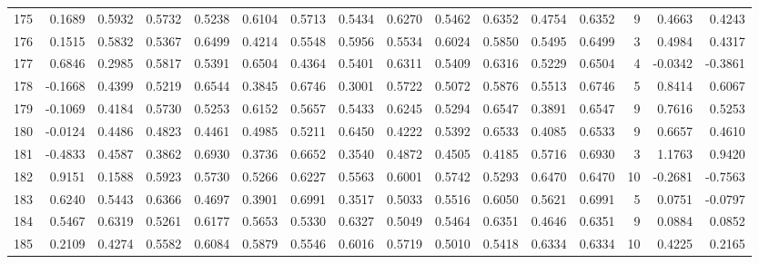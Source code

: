 \begin{tabular}{lrrrrrrrrrrrrrrr}
175 &      0.1689 &  0.5932 &  0.5732 &  0.5238 &  0.6104 &  0.5713 &  0.5434 &  0.6270 &  0.5462 &  0.6352 &   0.4754 &     0.6352 &      9 &                    0.4663 &                     0.4243 \\
176 &      0.1515 &  0.5832 &  0.5367 &  0.6499 &  0.4214 &  0.5548 &  0.5956 &  0.5534 &  0.6024 &  0.5850 &   0.5495 &     0.6499 &      3 &                    0.4984 &                     0.4317 \\
177 &      0.6846 &  0.2985 &  0.5817 &  0.5391 &  0.6504 &  0.4364 &  0.5401 &  0.6311 &  0.5409 &  0.6316 &   0.5229 &     0.6504 &      4 &                   -0.0342 &                    -0.3861 \\
178 &     -0.1668 &  0.4399 &  0.5219 &  0.6544 &  0.3845 &  0.6746 &  0.3001 &  0.5722 &  0.5072 &  0.5876 &   0.5513 &     0.6746 &      5 &                    0.8414 &                     0.6067 \\
179 &     -0.1069 &  0.4184 &  0.5730 &  0.5253 &  0.6152 &  0.5657 &  0.5433 &  0.6245 &  0.5294 &  0.6547 &   0.3891 &     0.6547 &      9 &                    0.7616 &                     0.5253 \\
180 &     -0.0124 &  0.4486 &  0.4823 &  0.4461 &  0.4985 &  0.5211 &  0.6450 &  0.4222 &  0.5392 &  0.6533 &   0.4085 &     0.6533 &      9 &                    0.6657 &                     0.4610 \\
181 &     -0.4833 &  0.4587 &  0.3862 &  0.6930 &  0.3736 &  0.6652 &  0.3540 &  0.4872 &  0.4505 &  0.4185 &   0.5716 &     0.6930 &      3 &                    1.1763 &                     0.9420 \\
182 &      0.9151 &  0.1588 &  0.5923 &  0.5730 &  0.5266 &  0.6227 &  0.5563 &  0.6001 &  0.5742 &  0.5293 &   0.6470 &     0.6470 &     10 &                   -0.2681 &                    -0.7563 \\
183 &      0.6240 &  0.5443 &  0.6366 &  0.4697 &  0.3901 &  0.6991 &  0.3517 &  0.5033 &  0.5516 &  0.6050 &   0.5621 &     0.6991 &      5 &                    0.0751 &                    -0.0797 \\
184 &      0.5467 &  0.6319 &  0.5261 &  0.6177 &  0.5653 &  0.5330 &  0.6327 &  0.5049 &  0.5464 &  0.6351 &   0.4646 &     0.6351 &      9 &                    0.0884 &                     0.0852 \\
185 &      0.2109 &  0.4274 &  0.5582 &  0.6084 &  0.5879 &  0.5546 &  0.6016 &  0.5719 &  0.5010 &  0.5418 &   0.6334 &     0.6334 &     10 &                    0.4225 &                     0.2165 \\

\end{tabular}
